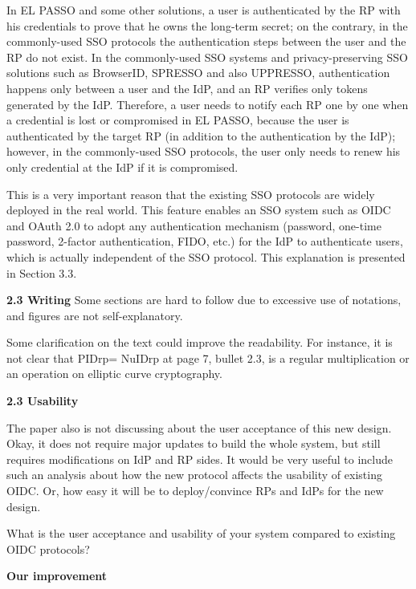 \documentclass[letterpaper,onecolumn,10pt]{article}
\begin{document}
In EL PASSO and some other solutions,
    a user is authenticated by the RP with his credentials
            to prove that he owns the long-term secret;
            on the contrary,
 in the commonly-used SSO protocols    the authentication steps between the user and the RP do not exist.
In the commonly-used SSO systems and privacy-preserving SSO solutions
    such as BrowserID, SPRESSO and also UPPRESSO,
    authentication happens only between a user and the IdP,
    and an RP verifies only tokens generated by the IdP.
Therefore,
        a user needs to notify each RP one by one when a credential is lost or compromised in EL PASSO,
    because the user is authenticated by the target RP (in addition to the authentication by the IdP);
however, in the commonly-used SSO protocols, the user only needs to renew his only credential at the IdP if it is compromised.

This is a very important reason that the existing SSO protocols are widely deployed in the real world.
This feature enables an SSO system such as OIDC and OAuth 2.0 to adopt any authentication mechanism
 (password, one-time password, 2-factor authentication, FIDO, etc.) for the IdP to authenticate users,
  which is actually independent of the SSO protocol.
This explanation is presented in Section 3.3.

\vspace{1mm}\noindent\textbf{2.3 Writing}
Some sections are hard to follow due to excessive use of notations, and figures are not self-explanatory.

Some clarification on the text could improve the readability. For instance, it is not clear that PIDrp= NuIDrp at page 7, bullet 2.3, is a regular multiplication or an operation on elliptic curve cryptography.


\noindent\textbf{2.3 Usability}

The paper also is not discussing about the user acceptance of this new design.
Okay, it does not require major updates to build the whole system, but still requires modifications on IdP and RP sides.
It would be very useful to include such an analysis about how the new protocol affects the usability of existing OIDC.
Or, how easy it will be to deploy/convince RPs and IdPs for the new design.

What is the user acceptance and usability of your system compared to existing OIDC protocols?

\vspace{1mm}\noindent\textbf{Our improvement}
\end{document}
